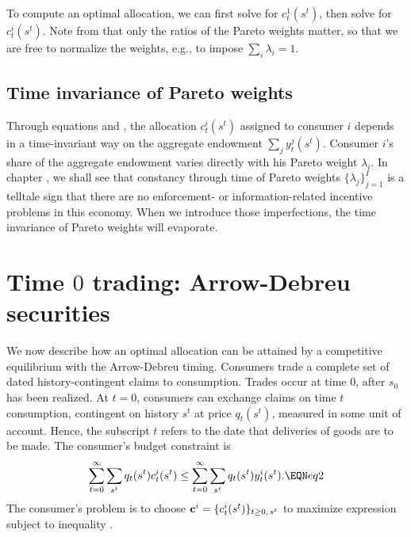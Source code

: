  To compute an optimal allocation, we can first solve  
for $c_t^1(s^t)$, then solve  for $c_t^i(s^t)$.
Note  from  that only the ratios of the Pareto weights matter,
so that we are free to normalize the weights, e.g., to impose
$\sum_i \lambda_i=1$.



\subsection{Time invariance of Pareto weights}
  Through  equations  and ,
the allocation $c_t^i(s^t)$ assigned to consumer $i$
depends in a time-invariant way on the aggregate endowment
$\sum_j y_t^j(s^t)$.  Consumer $i$'s share of the aggregate endowment varies
directly with his Pareto weight $\lambda_i$.   In chapter
, we shall see that  constancy through
time of Pareto weights
 $\{\lambda_j\}_{j=1}^I$ is a telltale sign that there are no
enforcement- or information-related  incentive problems
in this economy. %
When we introduce  those imperfections, the time invariance of  Pareto
weights will evaporate.
%


\section{Time $0$ trading: Arrow-Debreu securities}\label{sec:ADtime0}%
We now describe how an optimal allocation can be attained by a
competitive equilibrium with the Arrow-Debreu timing. Consumers
trade  a complete set of dated history-contingent claims to consumption. Trades occur at time $0$, after $s_0$
has been realized. At $t=0$, consumers can exchange claims on
time $t$ consumption, contingent on history $s^t$ at price
$q_t(s^t)$, measured in some unit of account. 
Hence, the subscript $t$ refers to the date that
deliveries of goods are to be made.  The consumer's budget 
constraint is
$$ \sum_{t=0}^\infty \sum_{s^t}  q_t(s^t)  c_t^i(s^t)   \leq
   \sum_{t=0}^\infty \sum_{s^t}  q_t(s^t) y_t^i(s^t).   \EQN eq2 $$
The consumer's problem is to choose  
${\bf c}^i =\{c^i_t(s^t)\}_{t\geq0,\,s^t}$
to maximize expression  subject to inequality  .

